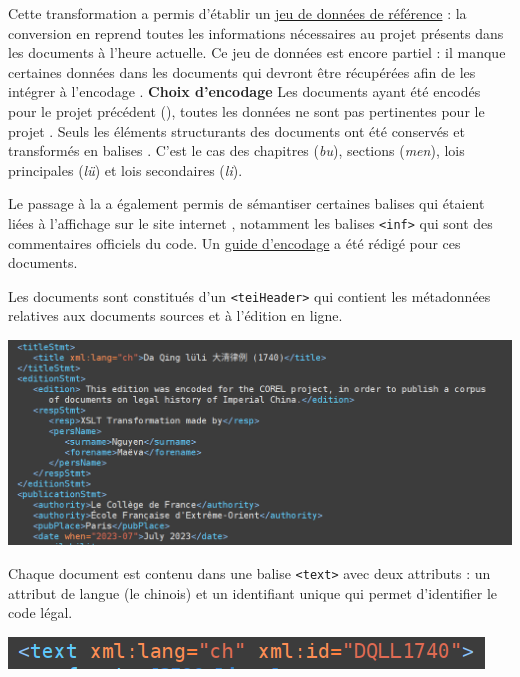 Cette transformation a permis d’établir un \href{https://sharedocs.huma-num.fr/wl/?id=yHHcUPKWyusazIZqWVLgtbZI7J65OaLA&path=TEI%282%29&mode=grid}{jeu de données de référence} : la conversion en \TEI reprend toutes les informations nécessaires au projet \COREL présents dans les documents \XML à l’heure actuelle. Ce jeu de données est encore partiel : il manque certaines données dans les documents \XML qui devront être récupérées afin de les intégrer à l’encodage \TEI.
\bigskip
\textbf{Choix d’encodage}
Les documents \XML ayant été encodés pour le projet précédent (\LSC), toutes les données ne sont pas pertinentes pour le projet \COREL. Seuls les éléments structurants des documents ont été conservés et transformés en balises \TEI. C’est le cas des chapitres (\textit{bu}), sections (\textit{men}), lois principales (\textit{lü}) et lois secondaires (\textit{li}). 

Le passage à la \TEI a également permis de sémantiser certaines balises \XML qui étaient liées à l’affichage sur le site internet \LSC, notamment les balises \texttt{<inf>} qui sont des commentaires officiels du code. Un \href{https://sharedocs.huma-num.fr/wl/?id=yHHcUPKWyusazIZqWVLgtbZI7J65OaLA&path=ODD&mode=grid}{guide d’encodage} a été rédigé pour ces documents. 

Les documents \TEI sont constitués d’un \texttt{<teiHeader>} qui contient les métadonnées relatives aux documents sources et à l’édition en ligne. 

\noindent \includegraphics[width=\textwidth]{images/annexe1.png}

Chaque document est contenu dans une balise \texttt{<text>} avec deux attributs : un attribut de langue (le chinois) et un identifiant unique qui permet d’identifier le code légal. 

\noindent \includegraphics[width=\textwidth]{images/annexe2.png}

